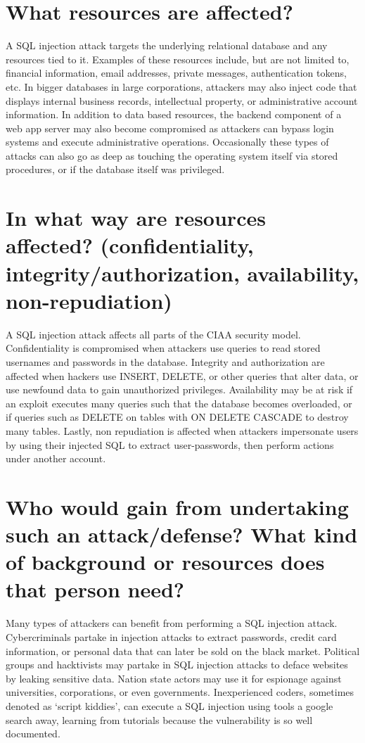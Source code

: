 \documentclass[12pt]{article}
\begin{document}
\section{What resources are affected?}

A SQL injection attack targets the underlying relational database and any resources tied to it. Examples of these resources include, but are not limited to, financial information, email addresses, private messages, authentication tokens, etc. In bigger databases in large corporations, attackers may also inject code that displays internal business records, intellectual property, or administrative account information. In addition to data based resources, the backend component of a web app server may also become compromised as attackers can bypass login systems and execute administrative operations. Occasionally these types of attacks can also go as deep as touching the operating system itself via stored procedures, or if the database itself was privileged.

\section{In what way are resources affected? (confidentiality, integrity/authorization, availability, non-repudiation)}

A SQL injection attack affects all parts of the CIAA security model. Confidentiality is compromised when attackers use queries to read stored usernames and passwords in the database. Integrity and authorization are affected when hackers use INSERT, DELETE, or other queries that alter data, or use newfound data to gain unauthorized privileges. Availability may be at risk if an exploit executes many queries such that the database becomes overloaded, or if queries such as DELETE on tables with ON DELETE CASCADE to destroy many tables. Lastly, non repudiation is affected when attackers impersonate users by using their injected SQL to extract user-passwords, then perform actions under another account.

\section{Who would gain from undertaking such an attack/defense? What kind of background or resources does that person need?}

Many types of attackers can benefit from performing a SQL injection attack. Cybercriminals partake in injection attacks to extract passwords, credit card information, or personal data that can later be sold on the black market. Political groups and hacktivists may partake in SQL injection attacks to deface websites by leaking sensitive data. Nation state actors may use it for espionage against universities, corporations, or even governments. Inexperienced coders, sometimes denoted as ‘script kiddies’, can execute a SQL injection using tools a google search away, learning from tutorials because the vulnerability is so well documented.
\end{document}
